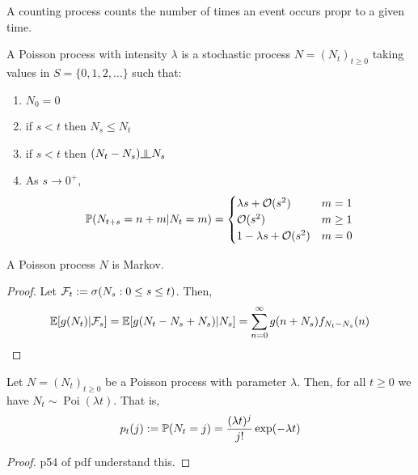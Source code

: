 \documentclass[12pt]{article}
\begin{document}
A counting process counts the number of times an event occurs propr to a given time.

\begin{definition}
A Poisson process with intensity \( \lambda \) is a stochastic process \( N = (N_t)_{t\geq 0} \) taking values in \( S = \{0,1,2,\ldots\} \) such that:
\begin{enumerate}[nolistsep]
    \item \( N_0 = 0 \)
    \item if \( s<t \) then \( N_s\leq N_t \)
    \item if \( s<t \) then \( (N_t-N_s) \indep N_s \)
    \item As \( s\to 0^+ \),
    \begin{align*}
        \mathbb{P}(N_{t+s} = n+m | N_t = m) = \begin{cases}
            \lambda s + \mathcal{O}(s^2) & m=1\\
            \mathcal{O}(s^2) & m\geq 1 \\
            1-\lambda s + \mathcal{O}(s^2) & m=0
        \end{cases}
    \end{align*}
\end{enumerate}
\end{definition}

\begin{lemma}
A Poisson process \( N \) is Markov.
\end{lemma}

\begin{proof}
Let \( \mathcal{F}_t := \sigma(N_s: 0\leq s\leq t) \). Then,
\begin{align*}
    \mathbb{E}[g(N_t)|\mathcal{F}_s] = \mathbb{E}[g(N_t-N_s+N_s)|N_s] = \sum_{n=0}^\infty g(n+N_s)f_{N_t-N_s}(n)
\end{align*}
\end{proof}

\begin{theorem}
Let \( N = (N_t)_{t\geq 0} \) be a Poisson process with parameter \( \lambda \). Then, for all \( t\geq 0 \) we have \( N_t\sim\operatorname{Poi}(\lambda t) \). That is,
\begin{align*}
    p_t(j) := \mathbb{P}(N_t = j) = \dfrac{(\lambda t)^j}{j!}\exp(-\lambda t)
\end{align*}
\end{theorem}

\begin{proof}
    p54 of pdf understand this.
\end{proof}
\end{document}
